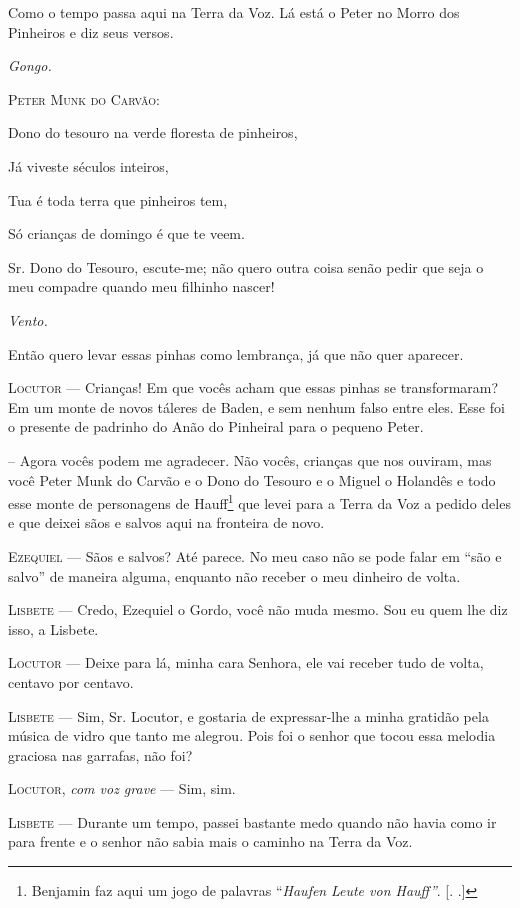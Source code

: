 \begin{myparindent}{0pt}
\begin{Parskip}
Como o tempo passa aqui na Terra da Voz. Lá está o Peter no Morro dos
Pinheiros e diz seus versos.

\emph{Gongo.}

\textsc{Peter Munk do Carvão}:

Dono do tesouro na verde floresta de pinheiros,

Já viveste séculos inteiros,

Tua é toda terra que pinheiros tem,

Só crianças de domingo é que te veem.

Sr. Dono do Tesouro, escute-me; não quero outra coisa senão pedir que
seja o meu compadre quando meu filhinho nascer!

\emph{Vento.}

Então quero levar essas pinhas como lembrança, já que não quer aparecer.

\textsc{Locutor} --- Crianças! Em que vocês acham que essas pinhas se
transformaram? Em um monte de novos táleres de Baden, e sem nenhum falso
entre eles. Esse foi o presente de padrinho do Anão do Pinheiral para o
pequeno Peter.

-- Agora vocês podem me agradecer. Não vocês, crianças que nos ouviram,
mas você Peter Munk do Carvão e o Dono do Tesouro e o Miguel o Holandês
e todo esse monte de personagens de Hauff\footnote{Benjamin faz aqui um
  jogo de palavras ``\emph{Haufen} \emph{Leute von Hauff''}. [.
  .]} que levei para a Terra da Voz a pedido deles e que deixei sãos
e salvos aqui na fronteira de novo.

\textsc{Ezequiel} --- Sãos e salvos? Até parece. No meu caso não se pode falar em
``são e salvo'' de maneira alguma, enquanto não receber o meu dinheiro
de volta.

\textsc{Lisbete} --- Credo, Ezequiel o Gordo, você não muda mesmo. Sou eu quem lhe
diz isso, a Lisbete.

\textsc{Locutor} --- Deixe para lá, minha cara Senhora, ele vai receber tudo de
volta, centavo por centavo.

\textsc{Lisbete} --- Sim, Sr. Locutor, e gostaria de expressar-lhe a minha
gratidão pela música de vidro que tanto me alegrou. Pois foi o senhor
que tocou essa melodia graciosa nas garrafas, não foi?

\textsc{Locutor}, \emph{com voz grave} --- Sim, sim.

\textsc{Lisbete} --- Durante um tempo, passei bastante medo quando não havia como
ir para frente e o senhor não sabia mais o caminho na Terra da Voz.


\end{Parskip}
\end{myparindent}
